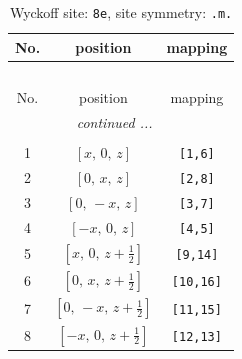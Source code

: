 \documentclass[fleqn,8pt]{jsarticle}
\begin{document}
\renewcommand{\arraystretch}{1.2}
\begin{longtable}{ccc}
\caption{Wyckoff site: {\tt 8e}, site symmetry: {\tt .m.}}
 \\
 \hline \hline
No. & position & mapping \\ \hline \endfirsthead

\multicolumn{2}{l}{\tablename\ \thetable{}} \\
 \hline \hline
No. & position & mapping \\ \hline \endhead

 \hline \hline
\multicolumn{2}{r}{\footnotesize\it continued ...} \\ \endfoot

 \hline \hline
\multicolumn{2}{r}{} \\ \endlastfoot

1 & $\left[ x,\, 0,\, z \right]$ & {\tt [1,6]} \\ \hline
2 & $\left[ 0,\, x,\, z \right]$ & {\tt [2,8]} \\ \hline
3 & $\left[ 0,\, - x,\, z \right]$ & {\tt [3,7]} \\ \hline
4 & $\left[ - x,\, 0,\, z \right]$ & {\tt [4,5]} \\ \hline
5 & $\left[ x,\, 0,\, z + \frac{1}{2} \right]$ & {\tt [9,14]} \\ \hline
6 & $\left[ 0,\, x,\, z + \frac{1}{2} \right]$ & {\tt [10,16]} \\ \hline
7 & $\left[ 0,\, - x,\, z + \frac{1}{2} \right]$ & {\tt [11,15]} \\ \hline
8 & $\left[ - x,\, 0,\, z + \frac{1}{2} \right]$ & {\tt [12,13]} \\
\end{longtable}
\renewcommand{\arraystretch}{1.2}
\end{document}
